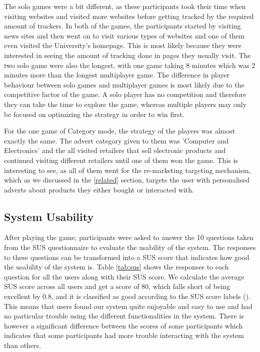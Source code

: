 \documentclass{l4proj}
\begin{document}
The solo games were a bit different, as these participants took their time when visiting websites and visited more websites before getting tracked by the required amount of trackers. In both of the games, the participants started by visiting news sites and then went on to visit various types of websites and one of them even visited the University's homepage. This is most likely because they were interested in seeing the amount of tracking done in pages they usually visit. The two solo game were also the longest, with one game taking 8 minutes which was 2 minutes more than the longest multiplayer game.
The difference in player behaviour between solo games and multiplayer games is most likely due to the competitive factor of the game. A solo player has no competition and therefore they can take the time to explore the game, whereas multiple players may only be focused on optimizing the strategy in order to win first. 

For the one game of Category mode, the strategy of the players was almost exactly the same. The advert category given to them was 'Computer and Electronics' and the all visited retailers that sell electronic products and continued visiting different retailers until one of them won the game. This is interesting to see, as all of them went for the re-marketing targeting mechanism, which as we discussed in the \ref{related} section, targets the user with personalised adverts about products they either bought or interacted with.

\subsection{System Usability}
After playing the game, participants were asked to answer the 10 questions taken from the SUS questionnaire to evaluate the usability of the system. The responses to these questions can be transformed into a SUS score that indicates how good the usability of the system is. Table \ref{tab:sus} shows the responses to each question for all the users along with their SUS score. We calculate the average SUS score across all users and get a score of 80, which falls short of being excellent by 0.8, and it is classified as good according to the SUS score labels (\cite{susscore}). This means that users found our system quite enjoyable and easy to use and had no particular trouble using the different functionalities in the system. There is however a significant difference between the scores of some participants which indicates that some participants had more trouble interacting with the system than others.
\end{document}
